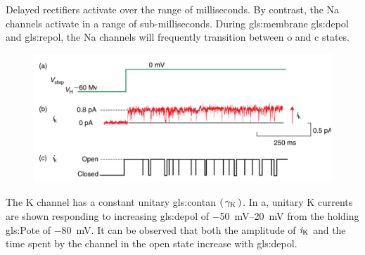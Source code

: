 \documentclass[class={myRUCProject}, crop=false]{standalone}
\begin{document}
Delayed rectifiers activate over the range of milliseconds. By contrast, the \gls{Na} channels activate in a range of sub-milliseconds. 
During \gls{gls:membrane} \gls{gls:depol} and \gls{gls:repol}, the \gls{Na} channels will frequently transition between \gls{o} and \gls{c} states. 
\begin{figure}[H]
    \centering
    \includegraphics[width=0.8\linewidth]{Pictures//Anakin/Kchannel.png}
    \caption{}\label{fig:Kchannel}
 \end{figure}

The \gls{K} channel has a constant unitary \gls{gls:contan} \(\left(\,\gamma_\mathrm{K}\,\right)\). In a, unitary \gls{K} currents are shown responding to increasing \gls{gls:depol} of \qtyrange{-50}{20}{\mV} from the holding \gls{gls:Pote} of \qty{-80}{\mV}. 
It can be observed that both the amplitude of \(\mathit{i}_\mathrm{K}\) and the time spent by the channel in the open state increase with \gls{gls:depol}. 
\end{document}
